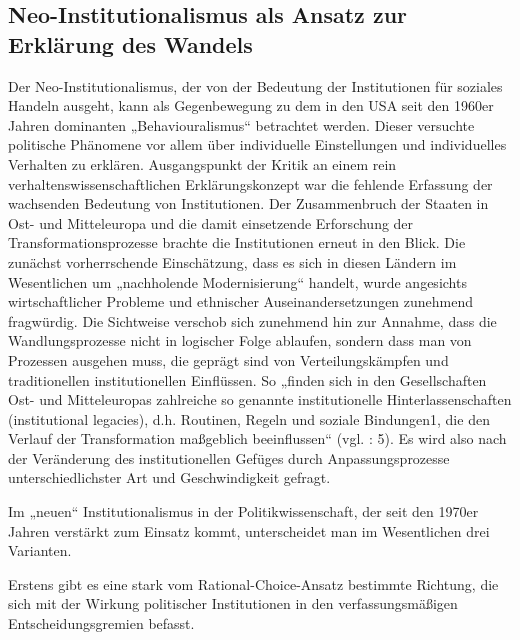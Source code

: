 \subsection{Neo-Institutionalismus als Ansatz zur Erklärung des Wandels}
Der Neo-Institutionalismus, der von der Bedeutung der Institutionen für soziales Handeln ausgeht, kann als Gegenbewegung zu dem in den USA seit den 1960er Jahren dominanten „Behaviouralismus“ betrachtet werden. Dieser versuchte politische Phänomene vor allem über individuelle Einstellungen und individuelles Verhalten zu erklären. Ausgangspunkt der Kritik an einem rein verhaltenswissenschaftlichen Erklärungskonzept war die fehlende Erfassung der wachsenden Bedeutung von Institutionen. Der Zusammenbruch der Staaten in Ost- und Mitteleuropa und die damit einsetzende Erforschung der Transformationsprozesse brachte die Institutionen erneut in den Blick. Die zunächst vorherrschende Einschätzung, dass es sich in diesen Ländern im Wesentlichen um „nachholende Modernisierung“ handelt, wurde angesichts wirtschaftlicher Probleme und ethnischer Auseinandersetzungen zunehmend fragwürdig. Die Sichtweise verschob sich zunehmend hin zur Annahme, dass die Wandlungsprozesse nicht in logischer Folge ablaufen, sondern dass man von Prozessen ausgehen muss, die geprägt sind von Verteilungskämpfen und traditionellen institutionellen Einflüssen. So „finden sich in den Gesellschaften Ost- und Mitteleuropas zahlreiche so genannte institutionelle Hinterlassenschaften (institutional legacies), d.h. Routinen, Regeln und soziale Bindungen1, die den Verlauf der Transformation maßgeblich beeinflussen“ (vgl. \cite{schulze}: 5). Es wird also nach der Veränderung des institutionellen Gefüges durch Anpassungsprozesse unterschiedlichster Art und Geschwindigkeit gefragt. \par
Im „neuen“ Institutionalismus in der Politikwissenschaft, der seit den 1970er Jahren verstärkt zum Einsatz kommt, unterscheidet man im Wesentlichen drei Varianten.\par
Erstens gibt es eine stark vom Rational-Choice-Ansatz bestimmte Richtung, die sich mit der Wirkung politischer Institutionen in den verfassungsmäßigen Entscheidungsgremien befasst.
